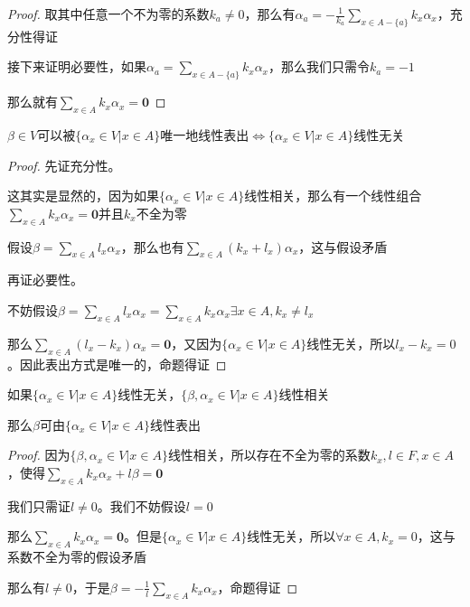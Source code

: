 \documentclass[12pt, a4paper, oneside, UTF8]{ctexbook}
\begin{document}
\begin{para}{0}
\begin{proof}
					取其中任意一个不为零的系数$k_a \neq 0$，那么有$\alpha_a =-\frac{1}{k_a}\sum\limits_{x \in A-\{a\}} k_x \alpha_x$，充分性得证

					接下来证明必要性，如果$\alpha_a =\sum\limits_{x \in A-\{a\}} k_x \alpha_x$，那么我们只需令$k_a=-1$

					那么就有$\sum\limits_{x \in A} k_x \alpha_x = \mathbf{0}$
				\end{proof}
				\begin{proposition}
					$\beta \in V$可以被$\{\alpha_x \in V| x\in A\}$唯一地线性表出$\Leftrightarrow\{\alpha_x \in V| x\in A\}$线性无关
				\end{proposition}
				\begin{proof}
					先证充分性。

					这其实是显然的，因为如果$\{\alpha_x \in V| x\in A\}$线性相关，那么有一个线性组合$\sum\limits_{x \in A} k_x \alpha_x = \mathbf{0}$并且$k_x$不全为零

					假设$\beta =\sum\limits_{x \in A} l_x \alpha_x$，那么也有$\sum\limits_{x \in A} (k_x + l_x) \alpha_x$，这与假设矛盾

					再证必要性。

					不妨假设$\beta =\sum\limits_{x \in A} l_x \alpha_x=\sum\limits_{x \in A} k_x \alpha_x \exists x \in A,k_x \neq l_x$

					那么$\sum\limits_{x \in A} (l_x-k_x) \alpha_x = \mathbf{0}$，又因为$\{\alpha_x \in V| x\in A\}$线性无关，所以$l_x-k_x=0$。因此表出方式是唯一的，命题得证
				\end{proof}
				\begin{proposition}
					如果$\{\alpha _x \in V| x \in A\}$线性无关，$\{\beta ,\alpha_x \in V| x\in A\}$线性相关

					那么$\beta $可由$\{\alpha_x \in V| x\in A\}$线性表出
				\end{proposition}
				\begin{proof}
					因为$\{\beta ,\alpha_x \in V| x\in A\}$线性相关，所以存在不全为零的系数$k_x,l\in F,x \in A$，使得$\sum\limits_{x \in A} k_x \alpha_x + l \beta = \mathbf{0}$

					我们只需证$l \neq 0$。我们不妨假设$l=0$

					那么$\sum\limits_{x \in A} k_x \alpha_x = \mathbf{0}$。但是$\{\alpha_x \in V| x\in A\}$线性无关，所以$\forall x \in A,k_x =0$，这与系数不全为零的假设矛盾

					那么有$l \neq 0$，于是$\beta  =-\frac{1}{l}\sum\limits_{x \in A} k_x \alpha_x$，命题得证
				\end{proof}
		\end{para}
\end{document}
